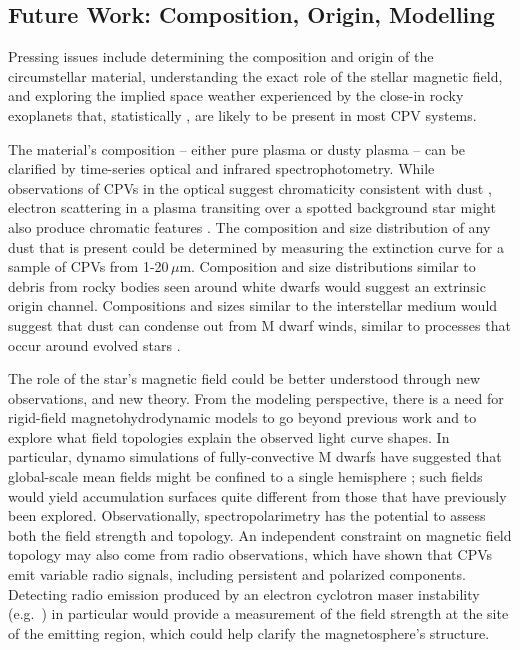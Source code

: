 \documentclass[11pt,twocolumn,tighten,linenumbers]{aastex7}
\begin{document}
\subsection{Future Work: Composition, Origin, Modelling}

Pressing issues include determining the composition and origin of the
circumstellar material, understanding the exact role of the stellar
magnetic field, and exploring the implied space weather experienced by
the close-in rocky exoplanets that, statistically \citep{Dressing2015},
are likely to be present in most CPV systems.

The material's composition -- either pure plasma or dusty plasma -- can
be clarified by time-series optical and infrared spectrophotometry.
While observations of CPVs in the optical suggest chromaticity
consistent with dust \citep{Tanimoto2020,Gunther2022,Koen2023}, 
electron scattering in a plasma transiting over a
spotted background star might also produce chromatic features
\citep{Rackham2018}.  The composition and size distribution of any dust
that is present could be determined by measuring the extinction curve
for a sample of CPVs from 1-20\,$\mu$m.  Composition and size
distributions similar to debris from rocky bodies seen around white
dwarfs \citep{Reach2009} would suggest an extrinsic origin channel.
Compositions and sizes similar to the interstellar medium would suggest
that dust can condense out from M dwarf winds, similar to processes that
occur around evolved stars \citep{Marigo2008}.

The role of the star's magnetic field could be better understood through
new observations, and new theory.  From the modeling perspective,
there is a need for rigid-field magnetohydrodynamic models to
go beyond previous work \citep{Townsend2008,Krticka2022}
and to explore what field topologies explain the observed light
curve shapes.  In particular, dynamo simulations of
fully-convective M dwarfs have suggested that global-scale mean fields
might be confined to a single hemisphere \citep{Brown2020}; such fields
would yield accumulation surfaces quite different from those that have
previously been explored.  Observationally, spectropolarimetry has the
potential to assess both the field strength and topology.  An
independent constraint on magnetic field topology may also come from
radio observations, which have shown \citep{Kaur2024} that CPVs emit
variable radio signals, including persistent and polarized components.
Detecting radio emission produced by an electron cyclotron maser
instability (e.g.~\citealt{Callingham2021}) in particular would provide
a measurement of the field strength at the site of the emitting region,
which could help clarify the magnetosphere's structure.
\end{document}
